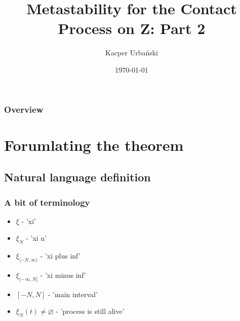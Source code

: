 \documentclass{beamer}
\title[Metastability for the Contact Process]{Metastability for the Contact Process on Z: Part 2} %
\author{Kacper Urbański} %
\institute[UvA] %
{
Universiteit van Amsterdam \\ %
\medskip
\textit{kacper.urbanski@protonmail.com} %
}
\date{\today} %
\begin{document}
\begin{frame}
\titlepage %
\end{frame}

\begin{frame}
\frametitle{Overview} %
\tableofcontents %
\end{frame}


\section{Forumlating the theorem} %

\subsection{Natural language definition} %

\begin{frame}
    \frametitle{A bit of terminology}
    \begin{itemize}
        \item $\xi$ - 'xi'
        \item $\xi_N$ - 'xi n'
        \item $\xi_{[-N, \infty)}$ - 'xi plus inf'
        \item $\xi_{(-\infty, N]}$ - 'xi minus inf'
        \item $[-N, N]$ - 'main interval'
        \item $\xi_N(t) \ne \varnothing$ - 'process is still alive'
    \end{itemize}
\end{frame}
\end{document}
